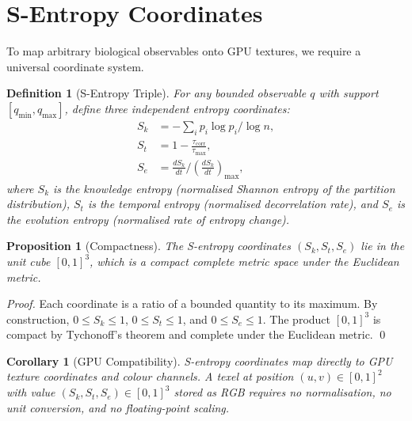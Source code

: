 \documentclass[11pt,twocolumn,a4paper]{article}
\newtheorem{corollary}[theorem]{Corollary}
\newtheorem{proposition}[theorem]{Proposition}
\newtheorem{definition}[theorem]{Definition}
\newcommand{\Sk}{S_k}
\newcommand{\St}{S_t}
\newcommand{\Se}{S_e}
\begin{document}

\section{S-Entropy Coordinates}
\label{sec:s-entropy}

To map arbitrary biological observables onto GPU textures, we require
a universal coordinate system.

\begin{definition}[S-Entropy Triple]
\label{def:s-entropy}
For any bounded observable $q$ with support $[q_{\min}, q_{\max}]$,
define three independent entropy coordinates:
\begin{align}
  \Sk &= -\sum_{i} p_i \log p_i \bigg/ \log n,
    \label{eq:sk} \\
  \St &= 1 - \frac{\tau_{\mathrm{corr}}}{\tau_{\max}},
    \label{eq:st} \\
  \Se &= \frac{d\Sk}{dt} \bigg/ \left(\frac{d\Sk}{dt}\right)_{\max},
    \label{eq:se}
\end{align}
where $\Sk$ is the \emph{knowledge entropy} (normalised Shannon
entropy of the partition distribution), $\St$ is the \emph{temporal
entropy} (normalised decorrelation rate), and $\Se$ is the
\emph{evolution entropy} (normalised rate of entropy change).
\end{definition}

\begin{proposition}[Compactness]
\label{prop:compactness}
The S-entropy coordinates $(\Sk, \St, \Se)$ lie in the unit cube
$[0,1]^3$, which is a compact complete metric space under the
Euclidean metric.
\end{proposition}

\begin{proof}
Each coordinate is a ratio of a bounded quantity to its maximum.  By
construction, $0 \leq \Sk \leq 1$, $0 \leq \St \leq 1$, and
$0 \leq \Se \leq 1$.  The product $[0,1]^3$ is compact by
Tychonoff's theorem and complete under the Euclidean metric.  \qed
\end{proof}

\begin{corollary}[GPU Compatibility]
\label{cor:gpu}
S-entropy coordinates map directly to GPU texture coordinates and
colour channels.  A texel at position $(u, v) \in [0,1]^2$ with value
$(\Sk, \St, \Se) \in [0,1]^3$ stored as RGB requires no
normalisation, no unit conversion, and no floating-point scaling.
\end{corollary}
\end{document}
